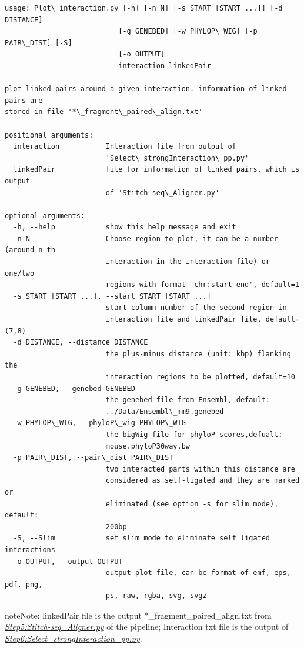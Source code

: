 \documentclass[letterpaper,10pt,english]{sphinxmanual}
\begin{document}
\begin{Verbatim}[commandchars=\\\{\}]
usage: Plot\_interaction.py [-h] [-n N] [-s START [START ...]] [-d DISTANCE]
                           [-g GENEBED] [-w PHYLOP\_WIG] [-p PAIR\_DIST] [-S]
                           [-o OUTPUT]
                           interaction linkedPair

plot linked pairs around a given interaction. information of linked pairs are
stored in file '*\_fragment\_paired\_align.txt'

positional arguments:
  interaction           Interaction file from output of
                        'Select\_strongInteraction\_pp.py'
  linkedPair            file for information of linked pairs, which is output
                        of 'Stitch-seq\_Aligner.py'

optional arguments:
  -h, --help            show this help message and exit
  -n N                  Choose region to plot, it can be a number (around n-th
                        interaction in the interaction file) or one/two
                        regions with format 'chr:start-end', default=1
  -s START [START ...], --start START [START ...]
                        start column number of the second region in
                        interaction file and linkedPair file, default=(7,8)
  -d DISTANCE, --distance DISTANCE
                        the plus-minus distance (unit: kbp) flanking the
                        interaction regions to be plotted, default=10
  -g GENEBED, --genebed GENEBED
                        the genebed file from Ensembl, default:
                        ../Data/Ensembl\_mm9.genebed
  -w PHYLOP\_WIG, --phyloP\_wig PHYLOP\_WIG
                        the bigWig file for phyloP scores,defualt:
                        mouse.phyloP30way.bw
  -p PAIR\_DIST, --pair\_dist PAIR\_DIST
                        two interacted parts within this distance are
                        considered as self-ligated and they are marked or
                        eliminated (see option -s for slim mode), default:
                        200bp
  -S, --Slim            set slim mode to eliminate self ligated interactions
  -o OUTPUT, --output OUTPUT
                        output plot file, can be format of emf, eps, pdf, png,
                        ps, raw, rgba, svg, svgz
\end{Verbatim}

\begin{notice}{note}{Note:}
linkedPair file is the output *\_fragment\_paired\_align.txt from {\hyperref[Analysis_pipeline:step5]{\emph{Step5:Stitch-seq\_Aligner.py}}} of the pipeline; Interaction txt file is the output of {\hyperref[Analysis_pipeline:step6]{\emph{Step6:Select\_strongInteraction\_pp.py}}}.
\end{notice}
\end{document}
